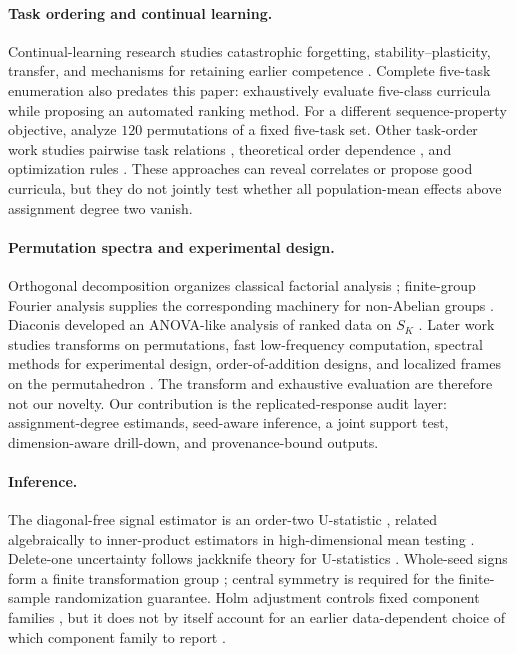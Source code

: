 \documentclass{article}
\begin{document}
\paragraph{Task ordering and continual learning.} Continual-learning research studies catastrophic forgetting, stability--plasticity, transfer, and mechanisms for retaining earlier competence \citep{kirkpatrick2017overcoming,parisi2019continual}. Complete five-task enumeration also predates this paper: \citet{singh2023learning} exhaustively evaluate five-class curricula while proposing an automated ranking method. For a different sequence-property objective, \citet{nguyen2019understanding} analyze $120$ permutations of a fixed five-task set. Other task-order work studies pairwise task relations \citep{bell2022ordering}, theoretical order dependence \citep{lin2023theory}, and optimization rules \citep{li2025optimal}. These approaches can reveal correlates or propose good curricula, but they do not jointly test whether all population-mean effects above assignment degree two vanish.

\paragraph{Permutation spectra and experimental design.} Orthogonal decomposition organizes classical factorial analysis \citep{speed1987anova}; finite-group Fourier analysis supplies the corresponding machinery for non-Abelian groups \citep{diaconis1988group}. Diaconis developed an ANOVA-like analysis of ranked data on $S_K$ \citep{diaconis1989ranked}. Later work studies transforms on permutations, fast low-frequency computation, spectral methods for experimental design, order-of-addition designs, and localized frames on the permutahedron \citep{huang2009fourier,plumb2015snfft,bailey2015spectraldesign,peng2019orderaddition,chen2021permutahedron}. The transform and exhaustive evaluation are therefore not our novelty. Our contribution is the replicated-response audit layer: assignment-degree estimands, seed-aware inference, a joint support test, dimension-aware drill-down, and provenance-bound outputs.

\paragraph{Inference.} The diagonal-free signal estimator is an order-two U-statistic \citep{hoeffding1948ustat}, related algebraically to inner-product estimators in high-dimensional mean testing \citep{chen2010twosample}. Delete-one uncertainty follows jackknife theory for U-statistics \citep{arvesen1969jackknife}. Whole-seed signs form a finite transformation group \citep{canay2017randomization,hemerik2018exact}; central symmetry is required for the finite-sample randomization guarantee. Holm adjustment controls fixed component families \citep{holm1979multiple}, but it does not by itself account for an earlier data-dependent choice of which component family to report \citep{berk2013postselection}.
\end{document}
